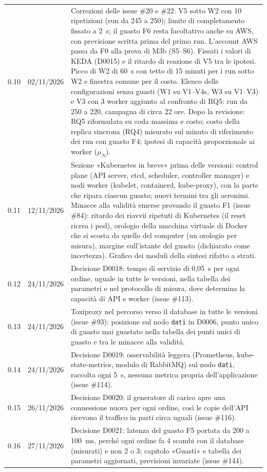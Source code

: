\begin{table}[h]
\begin{tabularx}{\linewidth}{@{}llL@{}}
0.10 & 02/11/2026 & Correzioni delle issue \#20 e \#22: V5 sotto W2 con 10 ripetizioni (run da 245 a 250); limite di completamento fissato a 2~s; il guasto F6 resta facoltativo anche su AWS, con previsione scritta prima del primo run. L'account AWS passa da F0 alla prova di M3b (S5--S6). Fissati i valori di KEDA (D0015) e il ritardo di reazione di V5 tra le ipotesi. Picco di W2 di 60~s con tetto di 15 minuti per i run sotto W2 e finestra comune per il costo. Elenco delle configurazioni senza guasti (W1 su V1--V4s, W3 su V1--V3) e V3 con 3 worker aggiunto al confronto di RQ5: run da 250 a 220, campagna di circa 22 ore. Dopo la revisione: RQ5 riformulata su coda massima e costo; costo della replica sincrona (RQ4) misurato sul minuto di riferimento dei run con guasto F4; ipotesi di capacità proporzionale ai worker ($\mu_N$). \\
0.11 & 12/11/2026 & Sezione «Kubernetes in breve» prima delle versioni: control plane (API server, etcd, scheduler, controller manager) e nodi worker (kubelet, containerd, kube-proxy), con la parte che ripara ciascun guasto; nuovi termini tra gli acronimi. Minacce alla validità emerse provando il guasto F1 (issue \#84): ritardo dei riavvii ripetuti di Kubernetes (il reset ricrea i pod), orologio della macchina virtuale di Docker che si scosta da quello del computer (un orologio per misura), margine sull'istante del guasto (dichiarato come incertezza). Grafico dei moduli della sintesi rifatto a strati. \\
0.12 & 24/11/2026 & Decisione D0018: tempo di servizio di 0,05~s per ogni ordine, uguale in tutte le versioni, nella tabella dei parametri e nel protocollo di misura, dove determina la capacità di API e worker (issue \#113). \\
0.13 & 24/11/2026 & Toxiproxy nel percorso verso il database in tutte le versioni (issue \#93): posizione sul nodo \texttt{dati} in D0006, punto unico di guasto mai guastato nella tabella dei punti unici di guasto e tra le minacce alla validità. \\
0.14 & 24/11/2026 & Decisione D0019: osservabilità leggera (Prometheus, kube-state-metrics, modulo di RabbitMQ) sul nodo \texttt{dati}, raccolta ogni 5~s, nessuna metrica propria dell'applicazione (issue \#114). \\
0.15 & 26/11/2026 & Decisione D0020: il generatore di carico apre una connessione nuova per ogni ordine, così le copie dell'API ricevono il traffico in parti circa uguali (issue \#116). \\
0.16 & 27/11/2026 & Decisione D0021: latenza del guasto F5 portata da 200 a 100~ms, perché ogni ordine fa 4 scambi con il database (misurati) e non 2 o 3; capitolo «Guasti» e tabella dei parametri aggiornati, previsioni invariate (issue \#144). \\
\bottomrule
\end{tabularx}
\end{table}

